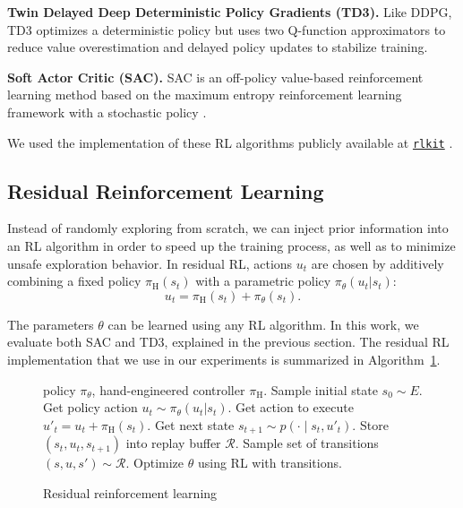 \textbf{Twin Delayed Deep Deterministic Policy Gradients (TD3).} 
Like DDPG, TD3 optimizes a deterministic policy \citep{fujimoto2018td3} but uses two Q-function approximators to reduce value overestimation \cite{vanhasselt2016doubledqn} and delayed policy updates to stabilize training.

\textbf{Soft Actor Critic (SAC).}
SAC is an off-policy value-based reinforcement learning method based on the maximum entropy reinforcement learning framework with a stochastic policy \citep{haarnoja2018sac}.

We used the implementation of these RL algorithms publicly available at \href{https://github.com/vitchyr/rlkit}{\texttt{rlkit}} \citep{pong2018tdm}.

\subsection{Residual Reinforcement Learning}

Instead of randomly exploring from scratch, we can inject prior information into an RL algorithm in order to speed up the training process, as well as to minimize unsafe exploration behavior. In residual RL, actions $u_t$ are chosen by additively combining a fixed policy $\pi_\text{H}(s_t)$ with a parametric policy $\pi_\theta(u_t|s_t)$:
\begin{equation}\label{eq:ctrl_seq}
    u_t = \pi_\text{H}(s_t) + \pi_\theta(s_t).
\end{equation}

The parameters $\theta$ can be learned using any RL algorithm. In this work, we evaluate both SAC and TD3, explained in the previous section. The residual RL implementation that we use in our experiments is summarized in Algorithm~\ref{alg:residualrl}.


\begin{figure}
    \begin{algorithm}[H]
       	\caption{Residual reinforcement learning}
       	\label{alg:residualrl}
       	\begin{algorithmic}[1]
        \REQUIRE policy $\pi_\theta$, hand-engineered controller $\pi_\text{H}$.
            \STATE Sample initial state $s_0 \sim E$.
                \STATE Get policy action $u_t \sim \pi_\theta(u_t|s_t)$.
                \STATE Get action to execute $u'_t = u_t + \pi_\text{H}(s_t)$.
                \STATE Get next state $s_{t+1} \sim p(\cdot \mid s_t, u'_t)$.
                \STATE Store $(s_t, u_t, s_{t+1})$ into replay buffer $\mathcal R$.
                \STATE Sample set of transitions $(s, u, s') \sim \mathcal R$.
                \STATE Optimize $\theta$ using RL with transitions.
            \ENDFOR
        \ENDFOR
       	\end{algorithmic}
    \end{algorithm}
    \vspace{1cm}
\end{figure}


